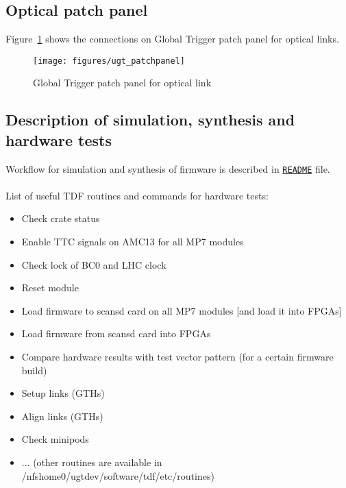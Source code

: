 \subsection{Optical patch panel}\label{sec:app:app_d}

Figure~\ref{fig:app:ugt_pp} shows the connections on Global Trigger patch panel for optical links.

\begin{figure}[htb]
\centering
\texttt{[image: figures/ugt\_patchpanel]}
\caption{Global Trigger patch panel for optical link}
\label{fig:app:ugt_pp}
\end{figure}

\subsection{Description of simulation, synthesis and hardware tests}\label{sec:app:app_e}

Workflow for simulation and synthesis of firmware is described in \href{\gitbranch/README.md}{\texttt{README}} file.\\\\
List of useful TDF routines and commands for hardware tests:
\begin{itemize}
\item Check crate status\\
\item Enable TTC signals on AMC13 for all MP7 modules\\
\item Check lock of BC0 and LHC clock\\
\item Reset module\\
\item Load firmware to scansd card on all MP7 modules [and load it into FPGAs]\\
\item Load firmware from scansd card into FPGAs\\
\item Compare hardware results with test vector pattern (for a certain firmware build)\\
\item Setup links (GTHs)\\
\item Align links (GTHs)\\
\item Check minipods\\
\item ... (other routines are available in /nfshome0/ugtdev/software/tdf/etc/routines)
\end{itemize}

\clearpage
